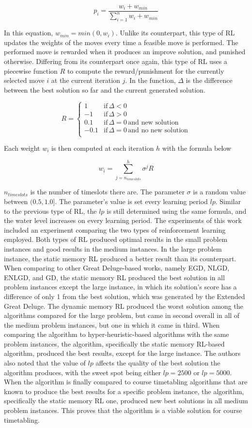 \[
	p_{i} = \frac{w_{i} + w_{min}}{\sum_{i=1}^{n}{w_{i} + w_{min}}}
\]

In this equation, $w_{min} = min(0, w_{i})$. Unlike its counterpart, this type of RL updates the weights of the moves every time a feasible move is performed. The performed move is rewarded when it produces an improve solution, and punished otherwise. Differing from its counterpart once again, this type of RL uses a piecewise function $R$ to compute the reward/punishment for the currently selected move $i$ at the current iteration $j$. In the function, $\Delta$ is the difference between the best solution so far and the current generated solution.

\[
	R = 
	\begin{cases}
	1 & \text{if}\,\Delta < 0 \\
	-1 & \text{if}\,\Delta > 0 \\
	0.1 & \text{if}\,\Delta = 0\,\text{and new solution} \\
	-0.1 & \text{if}\,\Delta = 0\,\text{and no new solution} \\
	\end{cases}
\]

Each weight $w_{i}$ is then computed at each iteration $h$ with the formula below

\[
	w_{i} = \sum_{j = n_{timeslots}}^{h} \sigma^{j}R
\]

$n_{timeslots}$ is the number of timeslots there are. The parameter $\sigma$ is a random value between $(0.5, 1.0]$. The parameter's value is set every learning period $lp$. Similar to the previous type of RL, the $lp$ is still determined using the same formula, and the water level increases on every learning period. The experiments of this work included an experiment comparing the two types of reinforcement learning employed. Both types of RL produced optimal results in the small problem instances and good results in the medium instances. In the large problem instance, the static memory RL produced a better result than its counterpart. When comparing to other Great Deluge-based works, namely EGD, NLGD, ENLGD, and GD, the static memory RL produced the best solution in all problem instances except the large instance, in which its solution's score has a difference of only 1 from the best solution, which was generated by the Extended Great Deluge. The dynamic memory RL produced the worst solution among the algorithms compared for the large problem, but came in second overall in all of the medium problem instances, but one in which it came in third. When comparing the algorithm to hyper-heuristic-based algorithms with the same problem instances, the algorithm, specifically the static memory RL-based algorithm, produced the best results, except for the large instance. The authors also noted that the value of $lp$ affects the quality of the best solution the algorithm produces, with the sweet spot being either $lp = 2500$ or $lp = 5000$. When the algorithm is finally compared to course timetabling algorithms that are known to produce the best results for a specific problem instance, the algorithm, specifically the static memory RL one, produced new best solutions in all medium problem instances. This proves that the algorithm is a viable solution for course timetabling.

